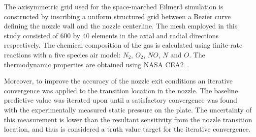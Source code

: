 \documentclass{AIAA}
\begin{document}
The axisymmetric grid used for the space-marched Eilmer3 simulation is constructed by inscribing a uniform structured grid between a Bezier curve defining the nozzle wall and the nozzle centerline.
The mesh employed in this study consisted of 600 by 40 elements in the axial and radial directions respectively.
The chemical composition of the gas is calculated using finite-rate reactions with a five species air model: $N_2$, $O_2$, $NO$, $N$ and $O$.
The thermodynamic properties are obtained using NASA CEA2~\cite{CEA2,Eilmer_TheoryBook}.


Moreover, to improve the accuracy of the nozzle exit conditions an iterative convergence was applied to the transition location in the nozzle.
The baseline predictive value was iterated upon until a satisfactory convergence was found with the experimentally measured static pressure on the plate.
The uncertainty of this measurement is lower than the resultant sensitivity from the nozzle transition location, and thus is considered a truth value target for the iterative convergence\cite{Doherty:PhD_Thesis_Scram_M10}.








 
\end{document}
